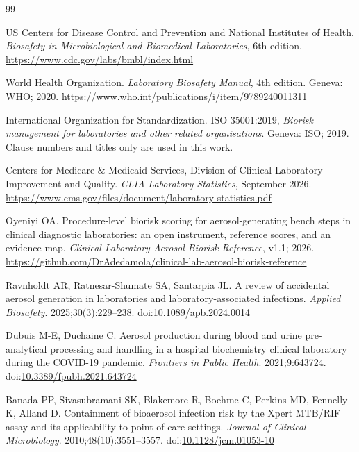 \begin{thebibliography}{99}
\setlength{\itemsep}{1.5pt}

US Centers for Disease Control and Prevention and National Institutes of
Health. \textit{Biosafety in Microbiological and Biomedical Laboratories},
6th edition. \url{https://www.cdc.gov/labs/bmbl/index.html}

World Health Organization. \textit{Laboratory Biosafety Manual}, 4th edition.
Geneva: WHO; 2020.
\url{https://www.who.int/publications/i/item/9789240011311}

International Organization for Standardization. ISO 35001:2019,
\textit{Biorisk management for laboratories and other related organisations}.
Geneva: ISO; 2019. Clause numbers and titles only are used in this work.

Centers for Medicare \& Medicaid Services, Division of Clinical Laboratory
Improvement and Quality. \textit{CLIA Laboratory Statistics}, September 2026.
\url{https://www.cms.gov/files/document/laboratory-statistics.pdf}

Oyeniyi OA. Procedure-level biorisk scoring for aerosol-generating bench steps
in clinical diagnostic laboratories: an open instrument, reference scores, and
an evidence map. \textit{Clinical Laboratory Aerosol Biorisk Reference},
v1.1; 2026.
\url{https://github.com/DrAdedamola/clinical-lab-aerosol-biorisk-reference}

Ravnholdt AR, Ratnesar-Shumate SA, Santarpia JL. A review of accidental
aerosol generation in laboratories and laboratory-associated infections.
\textit{Applied Biosafety}. 2025;30(3):229--238.
doi:\href{https://doi.org/10.1089/apb.2024.0014}{10.1089/apb.2024.0014}

Dubuis M-E, Duchaine C. Aerosol production during blood and urine
pre-analytical processing and handling in a hospital biochemistry clinical
laboratory during the COVID-19 pandemic. \textit{Frontiers in Public Health}.
2021;9:643724.
doi:\href{https://doi.org/10.3389/fpubh.2021.643724}{10.3389/fpubh.2021.643724}

Banada PP, Sivasubramani SK, Blakemore R, Boehme C, Perkins MD, Fennelly K,
Alland D. Containment of bioaerosol infection risk by the Xpert MTB/RIF assay
and its applicability to point-of-care settings. \textit{Journal of Clinical
Microbiology}. 2010;48(10):3551--3557.
doi:\href{https://doi.org/10.1128/jcm.01053-10}{10.1128/jcm.01053-10}


\end{thebibliography}
